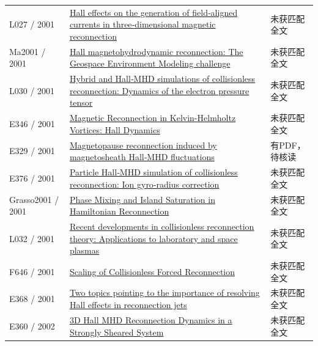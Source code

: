 \begin{longtable}{P{24mm}P{97mm}P{27mm}}
L027 / 2001 & \href{https://doi.org/10.1029/2000ja000290}{Hall effects on the generation of field‐aligned currents in three‐dimensional magnetic reconnection} & 未获匹配全文\\

Ma2001 / 2001 & \href{https://doi.org/10.1029/1999ja001004}{Hall magnetohydrodynamic reconnection: The Geospace Environment Modeling challenge} & 未获匹配全文\\

L030 / 2001 & \href{https://doi.org/10.1029/2000ja000398}{Hybrid and Hall‐MHD simulations of collisionless reconnection: Dynamics of the electron pressure tensor} & 未获匹配全文\\

E346 / 2001 & \href{http://ui.adsabs.harvard.edu/abs/2001AGUFMSM41B0811N/abstract}{Magnetic Reconnection in Kelvin-Helmholtz Vortices: Hall Dynamics} & 未获匹配全文\\

E329 / 2001 & \href{https://doi.org/10.1029/2000ja900151}{Magnetopause reconnection induced by magnetosheath Hall‐MHD fluctuations} & 有PDF，待核读\\

E376 / 2001 & \href{https://doi.org/10.1029/2000gl012797}{Particle Hall‐MHD simulation of collisionless reconnection: Ion gyro‐radius correction} & 未获匹配全文\\

Grasso2001 / 2001 & \href{https://doi.org/10.1103/physrevlett.86.5051}{Phase Mixing and Island Saturation in Hamiltonian Reconnection} & 未获匹配全文\\

L032 / 2001 & \href{https://doi.org/10.1063/1.1353803}{Recent developments in collisionless reconnection theory: Applications to laboratory and space plasmas} & 未获匹配全文\\

F646 / 2001 & \href{https://doi.org/10.1103/physrevlett.87.265003}{Scaling of Collisionless Forced Reconnection} & 未获匹配全文\\

E368 / 2001 & \href{https://ui.adsabs.harvard.edu/abs/2001sps..proc..140F/abstract}{Two topics pointing to the importance of resolving Hall effects in reconnection jets} & 未获匹配全文\\

E360 / 2002 & \href{http://ui.adsabs.harvard.edu/abs/2002AGUFMSM61A0471H/abstract}{3D Hall MHD Reconnection Dynamics in a Strongly Sheared System} & 未获匹配全文\\


\end{longtable}
